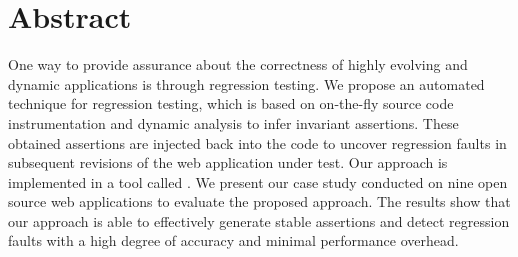 \section*{Abstract}
One way to provide assurance about the correctness of highly evolving and dynamic applications is through regression testing. We propose \cite{mirshokraie:icwe12} an automated technique for \javascript regression testing, which is based on on-the-fly \javascript source code instrumentation and dynamic analysis to infer invariant assertions. These obtained assertions are injected back into the \javascript code to uncover regression faults in subsequent revisions of the web application under test.
Our approach is implemented in a tool called \jsart. We present our case study conducted on nine open source web applications to evaluate the proposed approach. The results show that our approach is able to effectively generate stable assertions and detect \javascript regression faults with a high degree of accuracy and minimal performance overhead.


